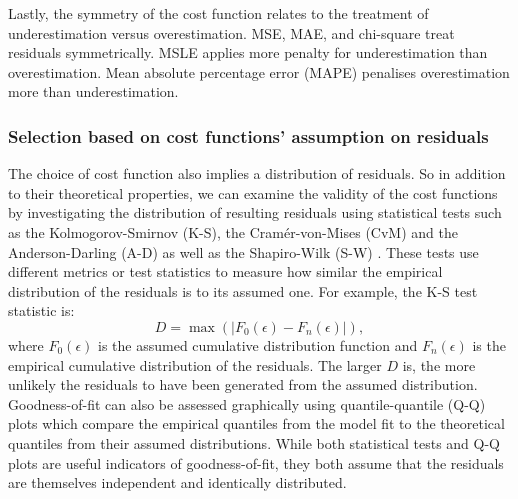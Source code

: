     Lastly, the symmetry of the cost function relates to the treatment of underestimation versus overestimation. MSE, MAE, and chi-square treat residuals symmetrically. MSLE applies more penalty for underestimation than overestimation. Mean absolute percentage error (MAPE) penalises overestimation more than underestimation. 


\subsubsection{Selection based on cost functions' assumption on residuals} \label{subsection-met-fits}

    The choice of cost function also implies a distribution of residuals. So in addition to their theoretical properties, we can examine the validity of the cost functions by investigating the distribution of resulting residuals using statistical tests such as the Kolmogorov-Smirnov (K-S), the Cram{\'e}r-von-Mises (CvM) and the Anderson-Darling (A-D) as well as the Shapiro-Wilk (S-W) \citep{Kandethody2015, Stephen1986}. These tests use different metrics or test statistics to measure how similar the empirical distribution of the residuals is to its assumed one. For example, the K-S test statistic is:
    \begin{equation}
        D = \max(|F_{0}(\epsilon) - F_{n}(\epsilon)|),
    \end{equation}
    where $F_{0}(\epsilon)$ is the assumed cumulative distribution function and $F_{n}(\epsilon)$ is the empirical cumulative distribution of the residuals. The larger $D$ is, the more unlikely the residuals to have been generated from the assumed distribution. Goodness-of-fit can also be assessed graphically using quantile-quantile (Q-Q) plots which compare the empirical quantiles from the model fit to the theoretical quantiles from their assumed distributions. While both statistical tests and Q-Q plots are useful indicators of goodness-of-fit, they both assume that the residuals are themselves independent and identically distributed. 


